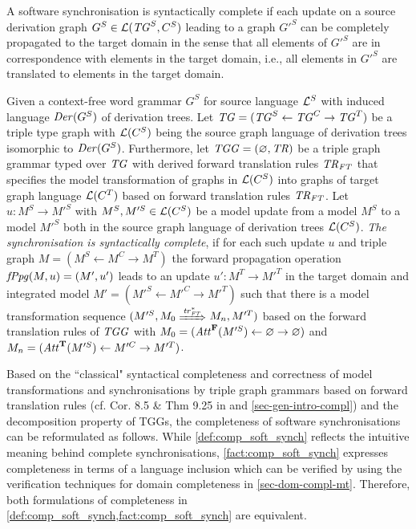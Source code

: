 A software synchronisation is syntactically complete if each update on a source derivation graph $G^S \in \mathcal{L}(\mathit{TG}^S,C^S)$ leading to a graph $G'^S$ can be completely propagated to the target domain in the sense that all elements of $G'^S$ are in correspondence with elements in the target domain, i.e., all elements in $G'^S$ are translated to elements in the target domain.

\begin{definition}
\label{def:comp_soft_synch}
Given a context-free word grammar $G^S$ for source language $\mathcal{L}^S$ with induced language $\mathit{Der}(G^S)$ of derivation trees.
Let $\mathit{TG}=(\mathit{TG}^S \gets \mathit{TG}^C \to \mathit{TG}^T)$ be a triple type graph with $\mathcal{L}(C^S)$ being the source graph language of derivation trees isomorphic to $\mathit{Der}(G^S)$. 
Furthermore, let $\mathit{TGG}=(\varnothing,\mathit{TR})$ be a triple graph grammar typed over $\mathit{TG}$ with derived forward translation rules $\mathit{TR}_\mathit{FT}$ that specifies the model transformation of graphs in $\mathcal{L}(C^S)$ into graphs of target graph language $\mathcal{L}(C^T)$ based on forward translation rules $\mathit{TR}_\mathit{FT}$.
Let $u\colon M^S \to M'^S$ with $M^S,M'^S \in \mathcal{L}(C^S)$ be a model update from a model $M^S$ to a model $M'^S$ both in the source graph language of derivation trees $\mathcal{L}(C^S)$.
\emph{The synchronisation is syntactically complete}, if for each such update $u$ and triple graph $M=(M^S \gets M^C \to M^T)$ the forward propagation operation $\mathit{fPpg}(M,u)=(M',u')$ leads to an update $u'\colon M^T \to M'^T$ in the target domain and integrated model $M'=(M'^S \gets M'^C \to M'^T)$ such that there is a model transformation sequence $(M'^S,M_0 \Trans{\tr^*_\FT} M_n,M'^T)$ based on the forward translation rules of $\mathit{TGG}$ with $M_0=(\mathit{Att}^\mathbf{F}(M'^S) \gets \varnothing \to \varnothing)$ and $M_n=(\mathit{Att}^\mathbf{T}(M'^S) \gets M'^C \to M'^T)$.
\envEndMarker
\end{definition}

Based on the ``classical" syntactical completeness and correctness of model transformations and synchronisations by triple graph grammars based on forward translation rules (cf. Cor. 8.5 \& Thm 9.25 in \cite{FAGT2} and \cref{sec-gen-intro-compl}) and the decomposition property of TGGs, the completeness of software synchronisations can be reformulated as follows.
While \cref{def:comp_soft_synch} reflects the intuitive meaning behind complete synchronisations, \cref{fact:comp_soft_synch} expresses completeness in terms of a language inclusion which can be verified by using the verification techniques for domain completeness in \cref{sec-dom-compl-mt}.
Therefore, both formulations of completeness in \cref{def:comp_soft_synch,fact:comp_soft_synch} are equivalent.

